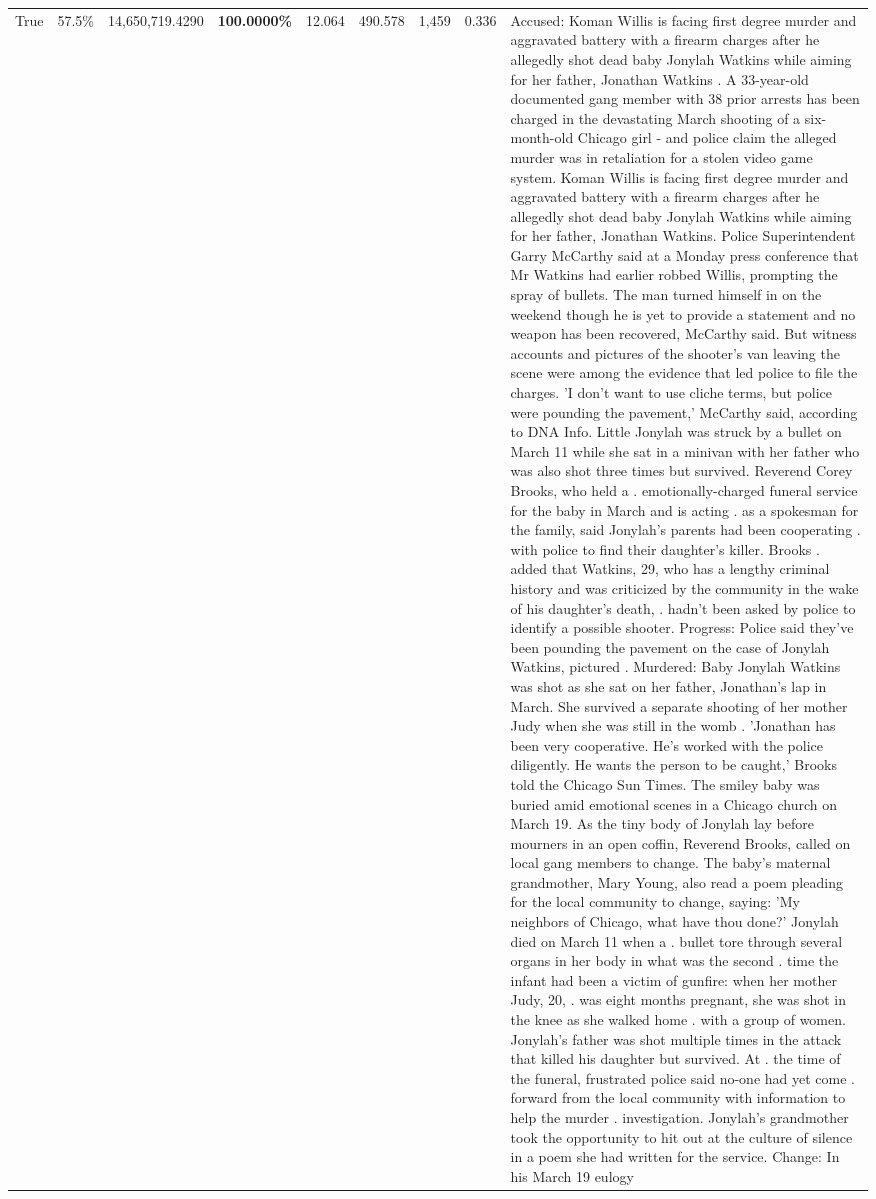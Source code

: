\begin{table}[H]
\begin{tabular}{lllrlllll}
True & 57.5\% & 14,650,719.4290 & \bfseries \color{red} 100.0000\% & 12.064 & 490.578 & 1,459 & 0.336 & Accused: Koman Willis is facing first degree murder and aggravated battery with a firearm charges after he allegedly shot dead baby Jonylah Watkins while aiming for her father, Jonathan Watkins . A 33-year-old documented gang member with 38 prior arrests has been charged in the devastating March shooting of a six-month-old Chicago girl - and police claim the alleged murder was in retaliation for a stolen video game system. Koman Willis is facing first degree murder and aggravated battery with a firearm charges after he allegedly shot dead baby Jonylah Watkins while aiming for her father, Jonathan Watkins. Police Superintendent Garry McCarthy said at a Monday press conference that Mr Watkins had earlier robbed Willis, prompting the spray of bullets. The man turned himself in on the weekend though he is yet to provide a statement and no weapon has been recovered, McCarthy said. But witness accounts and pictures of the shooter's van leaving the scene were among the evidence that led police to file the charges. 'I don't want to use cliche terms, but police were pounding the pavement,' McCarthy said, according to DNA Info. Little Jonylah was struck by a bullet on March 11 while she sat in a minivan with her father who was also shot three times but survived. Reverend Corey Brooks, who held a . emotionally-charged funeral service for the baby in March and is acting . as a spokesman for the family, said Jonylah's parents had been cooperating . with police to find their daughter's killer. Brooks . added that Watkins, 29, who has a lengthy criminal history and was criticized by the community in the wake of his daughter's death, . hadn't been asked by police to identify a possible shooter. Progress: Police said they've been pounding the pavement on the case of Jonylah Watkins, pictured . Murdered: Baby Jonylah Watkins was shot as she sat on her father, Jonathan's lap in March. She survived a separate shooting of her mother Judy when she was still in the womb . 'Jonathan has been very cooperative. He's worked with the police diligently. He wants the person to be caught,' Brooks told the Chicago Sun Times. The smiley baby was buried amid emotional scenes in a Chicago church on March 19. As the tiny body of Jonylah lay before mourners in an open coffin, Reverend Brooks, called on local gang members to change. The baby's maternal grandmother, Mary Young, also read a poem pleading for the local community to change, saying: 'My neighbors of Chicago, what have thou done?' Jonylah died on March 11 when a . bullet tore through several organs in her body in what was the second . time the infant had been a victim of gunfire: when her mother Judy, 20, . was eight months pregnant, she was shot in the knee as she walked home . with a group of women. Jonylah's father was shot multiple times in the attack that killed his daughter but survived. At . the time of the funeral, frustrated police said no-one had yet come . forward from the local community with information to help the murder . investigation. Jonylah's grandmother took the opportunity to hit out at the culture of silence in a poem she had written for the service. Change: In his March 19 eulogy 
\end{tabular}
\end{table}
